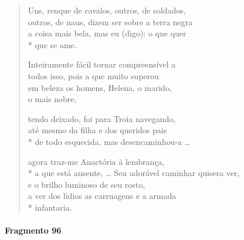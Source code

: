 \begin{verse}
Uns, renque de cavalos, outros, de soldados,\\
outros, de naus, dizem ser sobre a terra negra\\
a coisa mais bela, mas eu (digo): o que quer\\*
que se ame.

Inteiramente fácil tornar compreensível a\\
todos isso, pois a que muito superou\\			\EP[]
em beleza os homens, Helena, o marido, \\
o mais nobre,

tendo deixado, foi para Troia navegando,\\
até mesmo da filha e dos queridos pais\\*
de todo esquecida, mas desencaminhou-a \ldots{}

agora traz-me Anactória à lembrança,\\*
a que está ausente, \ldots{}\medskip
%
Seu adorável caminhar quisera ver,\\
e o brilho luminoso de seu rosto,\\
a ver dos lídios as carruagens e a armada\\*
infantaria.
\end{verse}


\paragraph{Fragmento 96}

